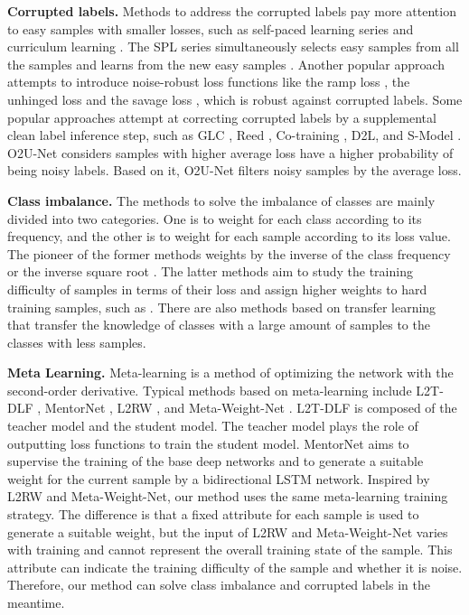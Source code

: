 \documentclass[letterpaper]{article} %
\newcommand{\bd}[1]{\textbf{#1}}
\begin{document}
\noindent\bd{Corrupted labels.}
Methods to address the corrupted labels pay more attention to easy samples with smaller losses, such as self-paced learning series \cite{kumar2010self,jiang2014easy,jiang2014self} and curriculum learning \cite{bengio2009curriculum}.
The SPL series simultaneously selects easy samples from all the samples and learns from the new easy samples \cite{pi2016self}.
Another popular approach attempts to introduce noise-robust loss functions like the ramp loss \cite{brooks2011support}, the unhinged loss \cite{van2015learning} and the savage loss \cite{masnadi2008design}, which is robust against corrupted labels.
Some popular approaches attempt at correcting corrupted labels by a supplemental clean label inference step, such as GLC \cite{hendrycks2018using}, Reed \cite{reed2014training}, Co-training \cite{han2018co}, D2L\cite{ma2018dimensionality}, and S-Model \cite{goldberger2016training}.
O2U-Net \cite{huang2019o2u} considers samples with higher average loss have a higher probability of being noisy labels.
Based on it, O2U-Net filters noisy samples by the average loss.


\noindent\bd{Class imbalance.}
The methods to solve the imbalance of classes are mainly divided into two categories.
One is to weight for each class according to its frequency, and the other is to weight for each sample according to its loss value.
The pioneer of the former methods weights by the inverse of the class frequency \cite{huang2016learning,wang2017learning} or the inverse square root \cite{mahajan2018exploring,mikolov2013distributed}.
The latter methods aim to study the training difficulty of  samples in terms of their loss and assign higher weights to hard training samples, such as \cite{freund1997decision,lin2017focal,malisiewicz2011ensemble,dong2017class}.
There are also methods based on transfer learning \cite{wang2017learning,cui2018large} that transfer the knowledge of classes with a large amount of samples to the classes with less samples.

\noindent\bd{Meta Learning.}
Meta-learning \cite{finn2017model,antoniou2018train,li2017meta,shu2018small,ravi2016optimization} is a method of optimizing the network with the second-order derivative.
Typical methods based on meta-learning include L2T-DLF \cite{wu2018learning}, MentorNet \cite{jiang2018mentornet}, L2RW \cite{ren2018learning}, and Meta-Weight-Net \cite{shu2019meta}.
L2T-DLF is composed of the teacher model and the student model.
The teacher model plays the role of outputting loss functions to train the student model.
MentorNet aims to supervise the training of the base deep networks and to generate a suitable weight for the current sample by a bidirectional LSTM network.
Inspired by L2RW and Meta-Weight-Net, our method uses the same meta-learning training strategy.
The difference is that a fixed attribute for each sample is used to generate a suitable weight, but the input of L2RW and Meta-Weight-Net varies with training and cannot represent the overall training state of the sample.
This attribute can indicate the training difficulty of the sample and whether it is noise.
Therefore, our method can solve class imbalance and corrupted labels in the meantime.
\end{document}
